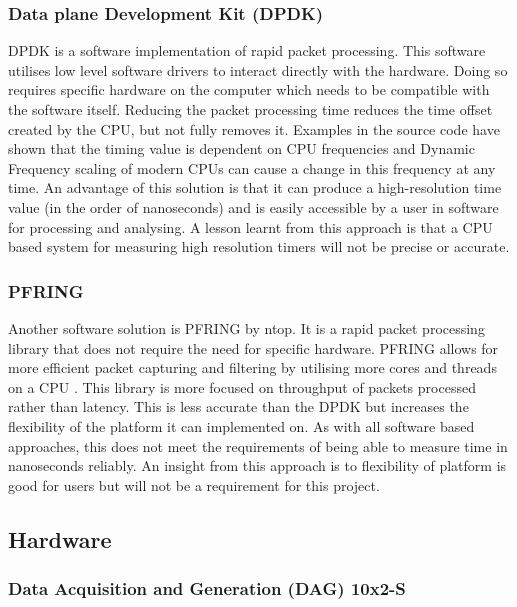 \subsubsection{Data plane Development Kit (DPDK)}

DPDK is a software implementation of rapid packet processing. 
This software utilises low level software drivers to interact directly with the hardware. 
Doing so requires specific hardware on the computer which needs to be compatible with the software itself.
Reducing the packet processing time reduces the time offset created by the CPU, but not fully removes it. 
Examples in the source code have shown that the timing value is dependent on CPU frequencies \cite{dpdkcode} 
and Dynamic Frequency scaling \cite{turboboost} of modern CPUs can cause a change in this frequency at any time.
An advantage of this solution is that it can produce a high-resolution time value (in the order of nanoseconds) 
and is easily accessible by a user in software for processing and analysing. 
A lesson learnt from this approach is that a CPU based system for measuring high resolution timers will not be precise or accurate.

\subsubsection{PF\textunderscore RING}

Another software solution is PF\textunderscore RING by ntop\texttrademark. 
It is a rapid packet processing library that does not require the need for specific hardware.  
PF\textunderscore RING allows for more efficient packet capturing and filtering by utilising more cores and threads on a CPU \cite{pfringworks}.
This library is more focused on throughput of packets processed rather than latency. 
This is less accurate than the DPDK but increases the flexibility of the platform it can implemented on. 
As with all software based approaches, this does not meet the requirements of being able to measure time in nanoseconds reliably.
An insight from this approach is to flexibility of platform is good for users but will not be a requirement for this project.

\subsection{Hardware}

\subsubsection{Data Acquisition and Generation (DAG) 10x2-S}

